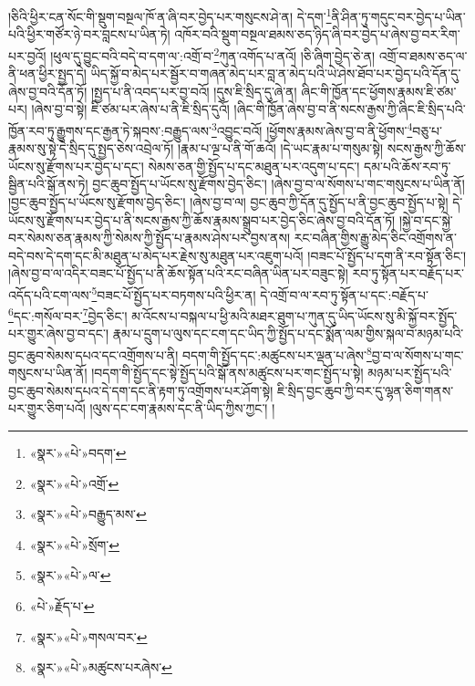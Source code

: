 །ཅིའི་ཕྱིར་ངན་སོང་གི་སྡུག་བསྔལ་ཁོ་ན་ཞི་བར་བྱེད་པར་གསུངས་ཤེ་ན། དེ་དག་\footnote{«སྣར་»«པེ་»བདག་}ནི་ཤིན་ཏུ་གདུང་བར་བྱེད་པ་ཡིན་པའི་ཕྱིར་གཙོར་ཉེ་བར་བླངས་པ་ཡིན་ཏེ། འཁོར་བའི་སྡུག་བསྔལ་ཐམས་ཅད་ཉིད་ཞི་བར་བྱེད་པ་ཞེས་བྱ་བར་རིག་པར་བྱའོ། །ཕུལ་དུ་བྱུང་བའི་བདེ་བ་དག་ལ་:འགྲོ་བ་\footnote{«སྣར་»«པེ་»འགྲོ་}ཀུན་འགོད་པ་ནའོ། །ཅི་ཞིག་བྱེད་ཅེ་ན། འགྲོ་བ་ཐམས་ཅད་ལ་ནི་ཕན་ཕྱིར་སྤྱད་དེ། ཡིད་སྐྱོ་བ་མེད་པར་སྦྱོར་བ་གཞན་མེད་པར་བླ་ན་མེད་པའི་ཡེ་ཤེས་ཐོབ་པར་བྱེད་པའི་དོན་དུ་ཞེས་བྱ་བའི་དོན་ཏོ། །སྤྱད་པ་ནི་འབད་པར་བྱ་བའོ། །དུས་ཇི་སྲིད་དུ་ཞེ་ན། ཞིང་གི་ཁྱོན་དང་ཕྱོགས་རྣམས་ཇི་ཙམ་པར། །ཞེས་བྱ་བ་སྟེ། ཇི་ཙམ་པར་ཞེས་པ་ནི་ཇི་སྲིད་དུའོ། །ཞིང་གི་ཁྱོན་ཞེས་བྱ་བ་ནི་སངས་རྒྱས་ཀྱི་ཞིང་ཇི་སྲིད་པའི་ཁྱོན་རབ་ཏུ་རྒྱུགས་དང་རྒྱན་ཏེ་སྐབས་:བརྒྱུད་ལས་\footnote{«སྣར་»«པེ་»བརྒྱུད་མས་}འབྱུང་བའོ། །ཕྱོགས་རྣམས་ཞེས་བྱ་བ་ནི་ཕྱོགས་\footnote{«སྣར་»«པེ་»སྲོག་}བཅུ་པ་རྣམས་སུ་སྟེ་དེ་སྲིད་དུ་སྤྱད་ཅེས་འབྲེལ་ཏོ། །རྣམ་པ་ལྔ་པ་ནི་གོ་ཆའོ། །དེ་ཡང་རྣམ་པ་གསུམ་སྟེ། སངས་རྒྱས་ཀྱི་ཆོས་ཡོངས་སུ་རྫོགས་པར་བྱེད་པ་དང་། སེམས་ཅན་གྱི་སྤྱོད་པ་དང་མཐུན་པར་འདུག་པ་དང་། དམ་པའི་ཆོས་རབ་ཏུ་སྦྱིན་པའི་སྒོ་ནས་ཏེ། བྱང་ཆུབ་སྤྱོད་པ་ཡོངས་སུ་རྫོགས་བྱེད་ཅིང་། །ཞེས་བྱ་བ་ལ་སོགས་པ་གང་གསུངས་པ་ཡིན་ནོ། །བྱང་ཆུབ་སྤྱོད་པ་ཡོངས་སུ་རྫོགས་བྱེད་ཅིང་། །ཞེས་བྱ་བ་ལ། བྱང་ཆུབ་ཀྱི་དོན་དུ་སྤྱོད་པ་ནི་བྱང་ཆུབ་སྤྱོད་པ་སྟེ། དེ་ཡོངས་སུ་རྫོགས་པར་བྱེད་པ་ནི་སངས་རྒྱས་ཀྱི་ཆོས་རྣམས་སྒྲུབ་པར་བྱེད་ཅིང་ཞེས་བྱ་བའི་དོན་ཏོ། །སྐྱེ་བ་དང་སྐྱེ་བར་སེམས་ཅན་རྣམས་ཀྱི་སེམས་ཀྱི་སྤྱོད་པ་རྣམས་ཤེས་པར་བྱས་ནས། རང་བཞིན་གྱིས་རྒྱུ་མེད་ཅིང་འགྲོགས་ན་བདེ་བས་དེ་དག་དང་མི་མཐུན་པ་མེད་པར་རྗེས་སུ་མཐུན་པར་འཇུག་པའོ། །བཟང་པོ་སྤྱོད་པ་དག་ནི་རབ་སྟོན་ཅིང་། །ཞེས་བྱ་བ་ལ་འདིར་བཟང་པོ་སྤྱོད་པ་ནི་ཆོས་སྟོན་པའི་རང་བཞིན་ཡིན་པར་བཟུང་སྟེ། རབ་ཏུ་སྟོན་པར་བརྗོད་པར་འདོད་པའི་ངག་ལས་\footnote{«སྣར་»«པེ་»ལ་}བཟང་པོ་སྤྱོད་པར་བཏགས་པའི་ཕྱིར་ན། དེ་འགྲོ་བ་ལ་རབ་ཏུ་སྟོན་པ་དང་:བརྗོད་པ་\footnote{«པེ་»རྗོད་པ་}དང་:གསོལ་བར་\footnote{«སྣར་»«པེ་»གསལ་བར་}བྱེད་ཅིང་། མ་འོངས་པ་བསྐལ་པ་ཕྱི་མའི་མཐར་ཐུག་པ་ཀུན་དུ་ཡིད་ཡོངས་སུ་མི་སྐྱོ་བར་སྤྱོད་པར་གྱུར་ཞེས་བྱ་བ་དང་། རྣམ་པ་དྲུག་པ་ལུས་དང་ངག་དང་ཡིད་ཀྱི་སྤྱོད་པ་དང་སྨོན་ལམ་གྱིས་སྐལ་བ་མཉམ་པའི་བྱང་ཆུབ་སེམས་དཔའ་དང་འགྲོགས་པ་ནི། བདག་གི་སྤྱོད་དང་:མཚུངས་པར་ལྡན་པ་ཞེས་\footnote{«སྣར་»«པེ་»མཚུངས་པརཞེས་}བྱ་བ་ལ་སོགས་པ་གང་གསུངས་པ་ཡིན་ནོ། །བདག་གི་སྤྱོད་དང་སྟེ་སྤྱོད་པའི་སྒོ་ནས་མཚུངས་པར་གང་སྤྱོད་པ་སྟེ། མཉམ་པར་སྤྱོད་པའི་བྱང་ཆུབ་སེམས་དཔའ་དེ་དག་དང་ནི་རྟག་ཏུ་འགྲོགས་པར་ཤོག་སྟེ། ཇི་སྲིད་བྱང་ཆུབ་ཀྱི་བར་དུ་ལྷན་ཅིག་གནས་པར་གྱུར་ཅིག་པའོ། །ལུས་དང་ངག་རྣམས་དང་ནི་ཡིད་ཀྱིས་ཀྱང་། །

